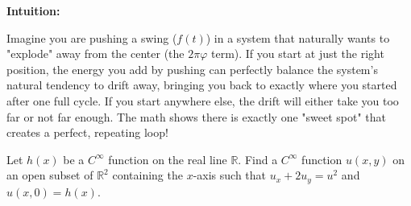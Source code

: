 \begin{solution}
\textbf{Intuition:}

Imagine you are pushing a swing ($f(t)$) in a system that naturally wants to "explode" away from the center (the $2\pi\varphi$ term). If you start at just the right position, the energy you add by pushing can perfectly balance the system's natural tendency to drift away, bringing you back to exactly where you started after one full cycle. If you start anywhere else, the drift will either take you too far or not far enough. The math shows there is exactly one "sweet spot" that creates a perfect, repeating loop!
\end{solution}

\vspace{2em}

\begin{exercise}
\label{analysis:2011:9}
Let $h(x)$ be a $C^{\infty}$ function on the real line $\mathbb{R}$. Find a $C^{\infty}$ function $u(x,y)$ on an open subset of $\mathbb{R}^2$ containing the $x$-axis such that $u_x + 2u_y = u^2$ and $u(x,0) = h(x)$.
\end{exercise}

